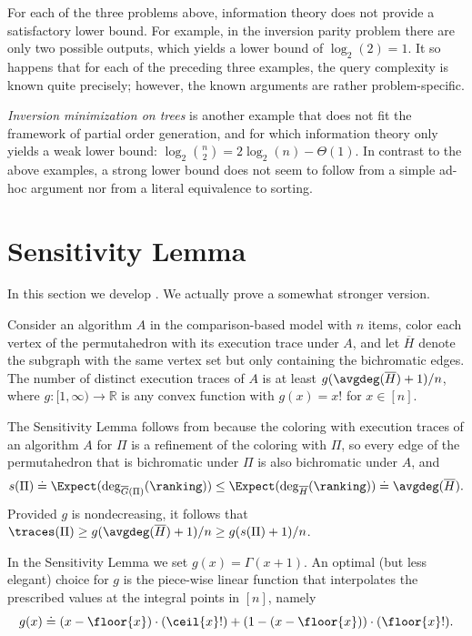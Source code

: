 \documentclass{toc}
\begin{document}
For each of the three problems above, information theory does not provide a satisfactory lower bound. For example, in the inversion parity problem there are only two possible outputs, which yields a lower bound of $\log_2(2)=1$. It so happens that for each of the preceding three examples, the query complexity is known quite precisely; however, the known arguments are rather problem-specific.

\emph{Inversion minimization on trees} is another example that does not fit the framework of partial order generation, and for which information theory only yields a weak lower bound: $\log_2 \binom{n}{2} = 2 \log_2(n) - \Theta(1)$. In contrast to the above examples, a strong lower bound does not seem to follow from a simple ad-hoc argument nor from a literal equivalence to sorting. 



\section{Sensitivity Lemma}
\label{sec:sensitivity}

In this section we develop .
We actually prove a somewhat stronger version.

\begin{lemma}\label{lemma:sensitivity:strong}
Consider an algorithm $A$ in the comparison-based
model with $n$ items, color each vertex of the permutahedron with its execution trace under $A$, and let $\overline{H}$ denote the subgraph with the same vertex set but only containing the bichromatic edges. The number of distinct execution traces of $A$ is at least $g(\avgdeg(\overline{H})+1)/n$, where
$g: [1,\infty) \to \mathbb{R}$ is any convex function with $g(x) = x!$ for $x \in [n]$.
\end{lemma}
The Sensitivity Lemma follows from  because the coloring with execution traces of an algorithm $A$ for $\Pi$ is a refinement of the coloring with $\Pi$, so every edge of the permutahedron that is bichromatic under $\Pi$ is also bichromatic under $A$, and
\[
s(\Pi) \doteq \Expect(\deg_{\overline{G}(\Pi)}(\ranking)) \le \Expect(\deg_{\overline{H}}(\ranking)) \doteq \avgdeg(\overline{H}). 
\]
Provided $g$ is nondecreasing, it follows that $\traces(\Pi) \ge g(\avgdeg(\overline{H})+1)/n \ge g(s(\Pi)+1)/n$.

In the Sensitivity Lemma we set $g(x) = \Gamma(x+1)$. An optimal (but less elegant) choice for $g$ is the piece-wise linear function that interpolates the prescribed values at the integral points in $[n]$, namely
\[    g(x) \doteq
      (x - \floor{x})\cdot(\ceil{x}!)
      +
      (1 - (x - \floor{x}))\cdot(\floor{x}!).
\]      
\end{document}
